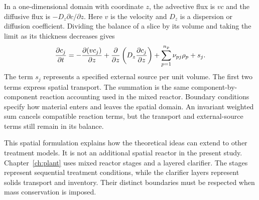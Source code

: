 In a one-dimensional domain with coordinate $z$, the advective flux is $v c$ and the diffusive flux is $-D_z\partial c/\partial z$. Here $v$ is the velocity and $D_z$ is a dispersion or diffusion coefficient. Dividing the balance of a slice by its volume and taking the limit as its thickness decreases gives
\begin{equation}
\equationname{One-dimensional advection-diffusion-reaction component equation}
\frac{\partial c_j}{\partial t}
=-\frac{\partial(v c_j)}{\partial z}
+\frac{\partial}{\partial z}
\left(D_z\frac{\partial c_j}{\partial z}\right)
+\sum_{p=1}^{n_p}\nu_{pj}\rho_p+s_j.
\label{eq:teaching_spatial_balance}
\end{equation}
The term $s_j$ represents a specified external source per unit volume. The first two terms express spatial transport. The summation is the same component-by-component reaction accounting used in the mixed reactor. Boundary conditions specify how material enters and leaves the spatial domain. An invariant weighted sum cancels compatible reaction terms, but the transport and external-source terms still remain in its balance.

This spatial formulation explains how the theoretical ideas can extend to other treatment models. It is not an additional spatial reactor in the present study. Chapter~\ref{ch:plant} uses mixed reactor stages and a layered clarifier. The stages represent sequential treatment conditions, while the clarifier layers represent solids transport and inventory. Their distinct boundaries must be respected when mass conservation is imposed.
